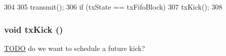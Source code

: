 \begin{DoxyCode}
304     {
305         transmit();
306         if (txState == txFifoBlock)
307             txKick();
308     }
\end{DoxyCode}
\hypertarget{classNSGigE_ac5484e8debdd6a2d3cf4c2902b832a76}{
\subsubsection[{txKick}]{\setlength{\rightskip}{0pt plus 5cm}void txKick ()}}
\label{classNSGigE_ac5484e8debdd6a2d3cf4c2902b832a76}


\begin{Desc}
\item[\hyperlink{todo__todo000069}{TODO}]do we want to schedule a future kick? \end{Desc}



